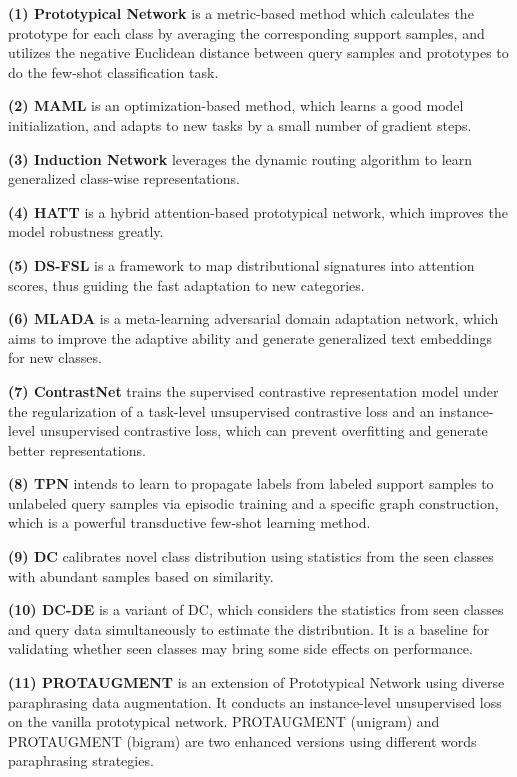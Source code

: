 \documentclass[letterpaper]{article} %
\begin{document}
\textbf{(1) Prototypical Network} \cite{snell2017prototypical} is a metric-based method which  calculates the prototype for
each class by averaging the corresponding support samples, and utilizes the negative Euclidean distance between query samples and prototypes to do the few-shot classification task.

\textbf{(2) MAML} \cite{finn2017model} is an optimization-based method, which learns a good model initialization, and adapts to new tasks by a small number of gradient steps.

\textbf{(3) Induction Network} \cite{DBLP:conf/emnlp/GengLLZJS19} leverages the dynamic routing algorithm to learn generalized class-wise representations.

\textbf{(4) HATT} \cite{DBLP:conf/aaai/GaoH0S19} is a hybrid attention-based prototypical network, which improves the model robustness greatly.

\textbf{(5) DS-FSL} \cite{iclr/BaoWCB20} is a framework to map distributional signatures into attention scores, thus guiding the fast adaptation to new categories.

\textbf{(6) MLADA} \cite{mlada} is a meta-learning adversarial domain adaptation network, which aims to improve the adaptive ability and generate generalized text embeddings for new classes.

\textbf{(7) ContrastNet} \cite{ContrastNet}  trains the supervised contrastive representation model
under the regularization of a task-level unsupervised contrastive loss and an instance-level unsupervised contrastive loss, which can prevent overfitting and generate better representations.

\textbf{(8) TPN} \cite{tpn} intends to learn to propagate labels from labeled support samples to unlabeled query samples via episodic training and a specific graph construction, which is a powerful transductive few-shot learning method.

\textbf{(9) DC} \cite{freelunch} calibrates novel class distribution using statistics from the seen classes with abundant samples based on similarity.

\textbf{(10) DC-DE} is a variant of DC, which considers the statistics from seen classes and query data simultaneously to estimate the distribution. It is a baseline for validating whether seen classes may bring some side effects on performance.

\textbf{(11) PROTAUGMENT} \cite{ProtAugment} is an extension of Prototypical Network \cite{snell2017prototypical} using diverse paraphrasing data augmentation. It conducts an instance-level unsupervised loss on the vanilla prototypical network. PROTAUGMENT (unigram) and PROTAUGMENT (bigram) are two enhanced versions using different words paraphrasing strategies.
\end{document}
